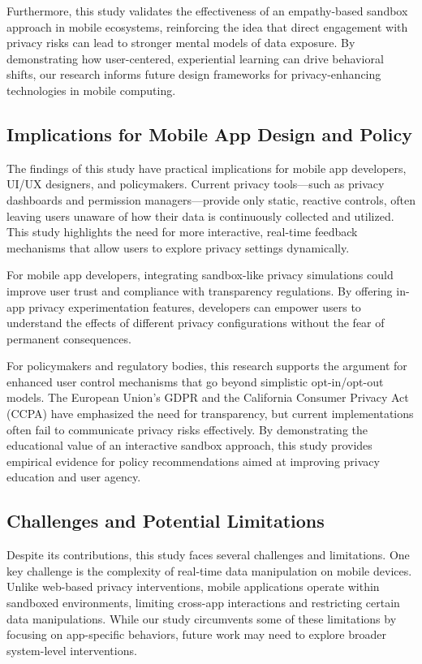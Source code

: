\documentclass[acmlarge, nonacm]{acmart}
\begin{document}
Furthermore, this study validates the effectiveness of an empathy-based sandbox approach in mobile ecosystems, reinforcing the idea that direct engagement with privacy risks can lead to stronger mental models of data exposure. By demonstrating how user-centered, experiential learning can drive behavioral shifts, our research informs future design frameworks for privacy-enhancing technologies in mobile computing.

\subsection{Implications for Mobile App Design and Policy}
The findings of this study have practical implications for mobile app developers, UI/UX designers, and policymakers. Current privacy tools—such as privacy dashboards and permission managers—provide only static, reactive controls, often leaving users unaware of how their data is continuously collected and utilized. This study highlights the need for more interactive, real-time feedback mechanisms that allow users to explore privacy settings dynamically.

For mobile app developers, integrating sandbox-like privacy simulations could improve user trust and compliance with transparency regulations. By offering in-app privacy experimentation features, developers can empower users to understand the effects of different privacy configurations without the fear of permanent consequences.

For policymakers and regulatory bodies, this research supports the argument for enhanced user control mechanisms that go beyond simplistic opt-in/opt-out models. The European Union’s GDPR and the California Consumer Privacy Act (CCPA) have emphasized the need for transparency, but current implementations often fail to communicate privacy risks effectively. By demonstrating the educational value of an interactive sandbox approach, this study provides empirical evidence for policy recommendations aimed at improving privacy education and user agency.

\subsection{Challenges and Potential Limitations}

Despite its contributions, this study faces several challenges and limitations. One key challenge is the complexity of real-time data manipulation on mobile devices. Unlike web-based privacy interventions, mobile applications operate within sandboxed environments, limiting cross-app interactions and restricting certain data manipulations. While our study circumvents some of these limitations by focusing on app-specific behaviors, future work may need to explore broader system-level interventions.
\end{document}
